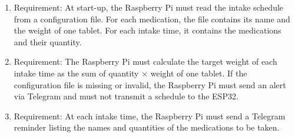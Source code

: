 \begin{enumerate}[label*=\arabic*.]
\begin{enumerate}[label*=\arabic*.]
			\item \label{req.1.9} Requirement: At start-up, the Raspberry Pi must read the intake schedule from a configuration file. For each medication, the file contains its name and the weight of one tablet. For each intake time, it contains the medications and their quantity.
			\item \label{req.1.10} Requirement: The Raspberry Pi must calculate the target weight of each intake time as the sum of quantity $\times$ weight of one tablet. If the configuration file is missing or invalid, the Raspberry Pi must send an alert via Telegram and must not transmit a schedule to the ESP32.
			\item \label{req.1.11} Requirement: At each intake time, the Raspberry Pi must send a Telegram reminder listing the names and quantities of the medications to be taken.
		\end{enumerate}


\end{enumerate}
